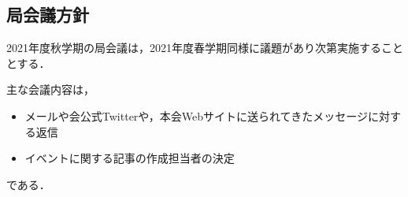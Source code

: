 \subsection*{局会議方針}


2021年度秋学期の局会議は，2021年度春学期同様に議題があり次第実施することとする．

主な会議内容は，
\begin{itemize}
    \item メールや会公式Twitterや，本会Webサイトに送られてきたメッセージに対する返信
    \item イベントに関する記事の作成担当者の決定
\end{itemize}
である．
